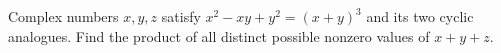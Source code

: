 Complex numbers $x,y,z$ satisfy $x^2-xy+y^2=(x+y)^3$ and its two cyclic analogues. Find the product of all distinct possible nonzero values of $x+y+z$.
